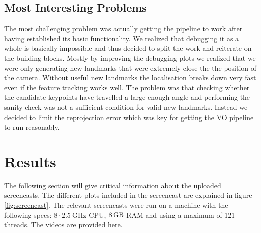 \documentclass{article}
\begin{document}

\subsection{Most Interesting Problems}

The most challenging problem was actually getting the pipeline to work after having established its basic functionality. We realized that debugging it as a whole is basically impossible and thus decided to split the work and reiterate on the building blocks. Mostly by improving the debugging plots we realized that we were only generating new landmarks that were extremely close the the position of the camera. Without useful new landmarks the localisation breaks down very fast even if the feature tracking works well. The problem was that checking whether the candidate keypoints have travelled a large enough angle and performing the sanity check was not a sufficient condition for valid new landmarks. Instead we decided to limit the reprojection error which was key for getting the VO pipeline to run reasonably.

\section{Results}

The following section will give critical information about the uploaded screencasts.
%
The different plots included in the screencast are explained in figure \ref{fig:screencast}.
%
The relevant screencasts were run on a machine with the following specs: $8\cdot\SI{2.5}{\giga\hertz}$ CPU, $\SI{8}{\giga\byte}$ RAM and using a maximum of 121 threads.
%
The videos are provided \href{https://www.youtube.com/watch?v=kb6LgC9SKW4&list=PLQ0WlGP2XqesJnw_vhn5eEh0ukmRttWWv&index=1}{here}.
\end{document}
